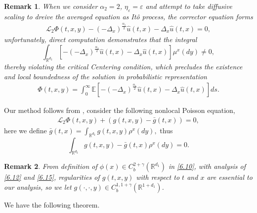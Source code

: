 \documentclass[11pt,reqno]{amsart}
\newtheorem{remark}{\indent Remark}[section]
\numberwithin{equation}{section}
\begin{document}
\begin{remark}\label{R61}
	When we consider $\alpha_{2}=2$, $\eta_{\varepsilon}=\varepsilon$ and attempt to take diffusive scaling to dreive the averaged equation as It\^{o} process, the corrector equation forms
	\begin{equation}\label{6.R1}
		\begin{split}
			\mathcal{L}_{2}\Phi(t,x,y)-(-\Delta_{x})^{\frac{\alpha_{1}}{2}}\hat{u}(t,x)-\Delta_{x}\hat{u}(t,x)=0,
		\end{split}
	\end{equation}
	unfortunately, direct computation demonstrates that the integral $$\int_{\mathbb{R}^{ d_{2}}} \left[  -(-\Delta_{x})^{\frac{\alpha_{1}}{2}}\hat{u}(t,x)-\Delta_{x}\hat{u}(t,x)\right]  \mu^{x}(dy)\neq0,$$ thereby violating the critical Centering condition, which precludes the existence and local boundedness of the solution in probabilistic representation
	\begin{equation}\label{6.R2}
		\begin{split}
			\Phi(t,x,y)=\int^{\infty}_{0}\mathbb{E}\left[ -(-\Delta_{x})^{\frac{\alpha_{1}}{2}}\hat{u}(t,x)-\Delta_{x}\hat{u}(t,x)\right]ds.
		\end{split}
	\end{equation}
\end{remark}
\fi



Our method follows from  \cite[Theorem 6.2, Theorem 6.3]{KY}, consider the  following nonlocal Poisson equation, 
\begin{equation}\label{6.19-1}
	\begin{split}
		\mathcal{L}_{2}\Phi(t,x,y)+( g(t,x,y)-\bar{g}(t,x))=0,
	\end{split}
\end{equation}
here we define  $\bar{g}(t,x)=\int_{\mathbb{R}^{d_{2}}}g(t,x,y)\rho^{x}(dy),$ thus
$$\int_{\mathbb{R}^{ d_{2}}}g(t,x,y)-\bar{g}(t,x)\rho^{x}(dy)=0.$$
\begin{remark}
From definition of $\phi(x)\in C^{2+\gamma}_{b}(\mathbb{R}^{d_{1}})$ in \eqref{6.10}, with analysis of \eqref{6.12} and \eqref{6.15}, regularities of $g(t,x,y)$ with respect to $t$ and $x$ are essential to our analysis, so we let $g(\cdot,\cdot,y)\in C_{b}^{1,1+\gamma}(\mathbb{R}^{1+d_{1}})$.
\end{remark}

We have the following theorem.
\end{document}
